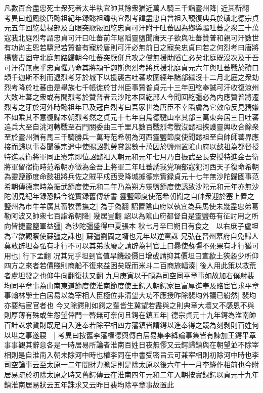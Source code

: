 凡數百合盡忠死士衆死者太半執宜帥其餘衆猶近萬人騎三千詣靈州降|{
	近其靳翻　考異曰趙鳳後唐懿祖紀年録懿祖諱執宜烈考諱盡忠自曾祖入覲復典兵於磧北德宗貞元五年回紇葛禄部及白眼突厥叛回紇忠貞可汗附于吐蕃因為鄉導驅吐蕃之衆三十萬寇我北庭烈考謂忠貞可汗曰吐蕃前年屠䧟靈鹽聞唐天子欲與吐蕃贊普和親可汗數世有功尚主恩若驕兒若贊普有寵於唐則可汗必無前日之寵矣忠貞曰若之何烈考曰唐將楊襲古固守北庭無路歸朝今吐蕃突厥併兵攻之儻無援助䧟亡必矣北庭既沒次及于吾可汗得無慮乎忠貞懼乃命其將頡千迦斯與烈考將兵援北庭貞元六年與吐蕃戰於磧口頡千迦斯不利而退烈考牙於城下以援襲古吐蕃攻圍經年諸部繼沒十二月北庭之衆劫烈考降於吐蕃由是舉族七千帳徙於甘州臣事贊普貞元十三年回紇奉誠可汗收復涼州大敗吐蕃之衆或有間烈考於贊普者云沙陀本回紇部人今聞回紇彊必為内應贊普將遷烈考之牙於河外時懿祖年已及冠白烈考曰吾家世為唐臣不幸䧟虜為它效命反見猜嫌不如乘其不意復歸本朝烈考然之貞元十七年自烏德鞬山率其部三萬東奔居三日吐蕃追兵大至自洮河轉戰至石門關委曲三千里凡數百戰烈考戰沒懿祖挾護靈輿收合餘衆至於靈州猶有馬三千騎勝兵一萬時范希朝為河西靈鹽節度使聞懿祖至自帥師蕃界應接而歸以事奏聞德宗遣中使賜詔慰勞賞錫數十萬因於鹽州置隂山府以懿祖為都督授特進驍衛將軍同正憲宗即位詔懿祖入朝元和元年七月乃自振武至長安授特進金吾衛將軍留宿衛時范希朝亦徵為金吾上將軍二年吐蕃誘我党項部寇犯河西天子復命希朝為靈鹽節度命懿祖將兵佐之賊平戍西受降城據德宗實録貞元十七年無沙陀歸國事范希朝傳德宗時為振武節度使元和二年乃為朔方靈鹽節度使誘致沙陀元和元年亦無沙陀朝見紀年録恐誤今從實録舊傳新書}
靈鹽節度使范希朝聞之自帥衆迎於塞上置之鹽州為市牛羊廣其畜牧善撫之|{
	為于偽翻}
詔置隂山府以執宜為兵馬使未幾盡忠弟葛勒阿波又帥衆七百詣希朝降|{
	幾居豈翻}
詔以為隂山府都督自是靈鹽每有征討用之所向皆捷靈鹽軍益彊|{
	為沙陀彊盛得中夏張本}
秋七月辛巳朔日有食之　以右庶子盧坦為宣歙觀察使蘇彊之誅也|{
	蘇彊劉闢之壻也元年以逆黨誅}
兄弘在晉州幕府自免歸人莫敢辟坦奏弘有才行不可以其弟故廢之請辟為判官上曰曏使蘇彊不死果有才行猶可用也|{
	行下孟翻}
况其兄乎坦到官值旱饑穀價日增或請抑其價坦曰宣歙土狹穀少所仰四方之來者若價賤則商船不復來益困矣既而米斗二百商旅輻湊|{
	後人用此策以救荒者盧坦發之也仰牛向翻復扶又翻}
九月庚寅以于頔為司空同平章事如故加右僕射裴均同平章事為山南東道節度使淮南節度使王鍔入朝鍔家巨富厚進奉及賂宦官求平章事翰林學士白居易以為宰相人臣極位非清望大功不應授昨除裴均外議已紛然|{
	裴均亦要結宦官者也}
今又除鍔則如鍔之輩皆生冀望若盡與之則典章大壞又不感恩不與則厚薄有殊或生怨望倖門一啓無可奈何且鍔在鎮五年|{
	德宗貞元十九年鍔為淮南帥}
百計誅求貨財既足自入進奉若除宰相四方藩鎮皆謂鍔以進奉得之競為刻剥則百姓何以堪之事遂寢　|{
	考異曰按舊李藩權德輿傳白居易集李絳論事集皆有諫加王鍔平章事事觀其辭意各是一時居易所論者淮南百姓日夜無憀又云鍔歸鎮與在朝望並不除宰相則是自淮南入朝未除河中時也權李同在中書受密旨云可兼宰相則初除河中時也李司空論事云至太原一二年間財力贍足則是除太原以後六年十一月李絳作相前也今附居易疏於初除太原之時又舊鍔傳云在淮南四年元和二年入朝按實録鍔以貞元十九年鎮淮南居易狀云五年誅求又云昨日裴均除平章事故置此}
